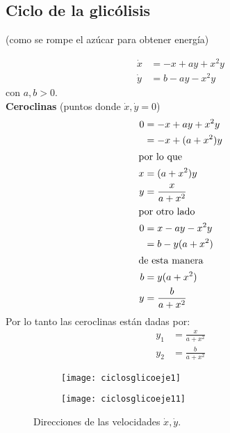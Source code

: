 \subsection{Ciclo de la glicólisis} (como se rompe el azúcar para obtener energía)

\begin{align*}
  \dot{x}  &= -x+ay + x^2y \\ 
  \dot{y}  &= b-ay -x^2y
\end{align*}
con $a,b >0$.  \\

\textbf{Ceroclinas} (puntos donde $\dot{x},\dot{y} = 0$)
\begin{align*}
  0  &= -x+ay+x^2y \\ 
   &= -x+(a+x^2)y \\
   \intertext{por lo que} 
   x  &= (a+x^2)y \\ 
   y  &= \frac{x}{a+x^2} \\
   \intertext{por otro lado}
   0  &= x-ay-x^2y \\ 
    &= b-y(a+x^2) \\ 
    \intertext{de esta manera}
    b  &= y(a+x^2) \\ 
    y  &= \frac{b}{a+x^2} \\ 
\end{align*}
Por lo tanto las ceroclinas están dadas por:
\begin{align}
  y_1  &= \frac{x}{a+x^2} \\ 
  y_2  &= \frac{b}{a+x^2}
\end{align}
\begin{figure}[H]
  \begin{subfigure}[c]{0.4\textwidth}
    \texttt{[image: ciclosglicoeje1]}
  \end{subfigure}
  \hfill
  \begin{subfigure}[c]{0.5\textwidth}
    \texttt{[image: ciclosglicoeje11]}
  \end{subfigure}
  \caption{Direcciones de las velocidades $\dot{x},\dot{y}.$}
  \label{dirrglic}
\end{figure}

